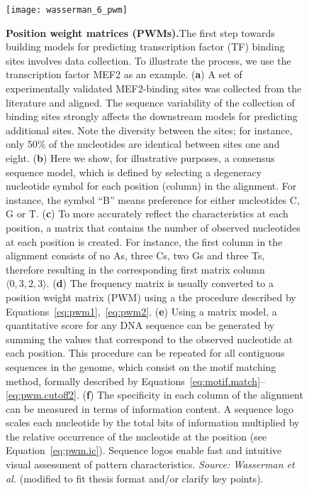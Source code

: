 \begin{figure}[h!]
\centering
\texttt{[image: wasserman\_6\_pwm]}
\caption[Position weight matrices (PWMs)]{\textbf{Position weight matrices (PWMs).}The first step towards building models for predicting transcription factor (TF) binding sites involves data collection. To illustrate the process, we use the transcription factor MEF2 as an example. (\textbf{a}) A set of experimentally validated MEF2-binding sites was collected from the literature and aligned. The sequence variability of the collection of binding sites strongly affects the downstream models for predicting additional sites. Note the diversity between the sites; for instance, only $50\%$ of the nucleotides are identical between sites one and eight. (\textbf{b}) Here we show, for illustrative purposes, a consensus sequence model, which is defined by selecting a degeneracy nucleotide symbol for each position (column) in the alignment. For instance, the symbol ``B'' means preference for either nucleotides C, G or T. (\textbf{c}) To more accurately reflect the characteristics at each position, a matrix that contains the number of observed nucleotides at each position is created. For instance, the first column in the alignment consists of no As, three Cs, two Gs and three Ts, therefore resulting in the corresponding first matrix column $\langle 0, 3, 2, 3 \rangle$. (\textbf{d}) The frequency matrix is usually converted to a position weight matrix (PWM) using a the procedure described by Equations~\ref{eq:pwm1},~\ref{eq:pwm2}. (\textbf{e}) Using a matrix model, a quantitative score for any DNA sequence can be generated by summing the values that correspond to the observed nucleotide at each position. This procedure can be repeated for all contiguous sequences in the genome, which consist on the motif matching method, formally described by Equations~\ref{eq:motif.match}--\ref{eq:pwm.cutoff2}. (\textbf{f}) The specificity in each column of the alignment can be measured in terms of information content. A sequence logo scales each nucleotide by the total bits of information multiplied by the relative occurrence of the nucleotide at the position (see Equation~\ref{eq:pwm.ic}). Sequence logos enable fast and intuitive visual assessment of pattern characteristics. \emph{Source: Wasserman et al.}\cite{wasserman2004} (modified to fit thesis format and/or clarify key points).}
\label{fig:wasserman_pwm}
\end{figure}

